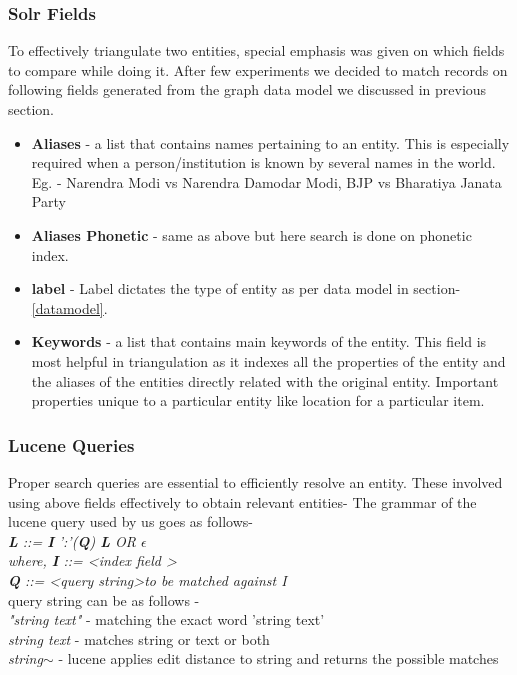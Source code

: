 \subsubsection{Solr Fields}
    To effectively triangulate two entities, special emphasis was given on which fields to compare while doing it. After few experiments we decided to match records on following fields generated from the graph data model we discussed in previous section.

\begin{itemize}
    \item \textbf{ Aliases }- a list that contains names pertaining to an entity. This is especially required when a person/institution is known by several names in the world. Eg. - Narendra Modi vs Narendra Damodar Modi, BJP vs Bharatiya Janata Party 
    \item \textbf{ Aliases  Phonetic } - same as above but here search is done on phonetic index.
    \item \textbf{ label } - Label dictates the type of entity as per data model in section- \ref{datamodel}.
    \item \textbf{ Keywords } - a list that contains main keywords of the entity. This field is most helpful in triangulation as it indexes all the properties of the entity and the aliases of the entities directly related with the original entity. Important properties unique to a particular entity like location for a particular item.
\end{itemize}

\subsubsection{Lucene Queries}
    Proper search queries are essential to efficiently resolve an entity. These involved using above fields effectively to obtain relevant entities- 
    The grammar of the lucene query used by us goes as follows-\\
        \emph{ \textbf{ L } ::=   \textbf{ I }':'(\textbf{Q}) \textbf{L}  OR $\epsilon$ } \\
       \emph{ where,  \textbf{I} ::= \textless index field \textgreater  }\\
        \emph{ \textbf{Q} ::= \textless query string\textgreater to be matched against I } \\

    query string can be as follows -\\
    
    \emph{ "string text" } - matching the exact word 'string text'\\
    \emph{ string text } - matches string or text or both \\
    \emph{ string$\sim$ } - lucene applies edit distance to string and returns the possible matches \\
    

